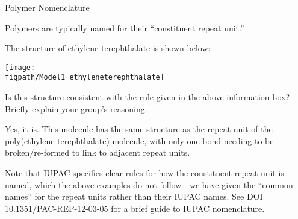 \begin{activity}{Polymer Nomenclature}
\begin{ctqs}
\begin{enumerate}
		\end{enumerate}

\end{ctqs}

\begin{infobox}
	Polymers are typically named for their ``constituent repeat unit.''
\end{infobox}

\begin{ctqs}

	\question The structure of ethylene terephthalate is shown below:
	
		\centerline{\texttt{[image: \\figpath/Model1\_ethyleneterephthalate]}}
		
		Is this structure consistent with the rule given in the above information box?  Briefly explain your group's reasoning.
		
		\begin{solution}[0.75in]
			Yes, it is.  This molecule has the same structure as the repeat unit of the poly(ethylene terephthalate) molecule, with only one bond needing to be broken/re-formed to link to adjacent repeat units.
			
			Note that IUPAC specifies clear rules for how the constituent repeat unit is named, which the above examples do not follow - we have given the ``common names'' for the repeat units rather than their IUPAC names.  See DOI 10.1351/PAC-REP-12-03-05 for a brief guide to IUPAC nomenclature.
		\end{solution}

\end{ctqs}


\clearpage


	



	


\begin{model}[Composition]
\label{\labelbase:mdl:composition}


\end{model}
\end{activity}

